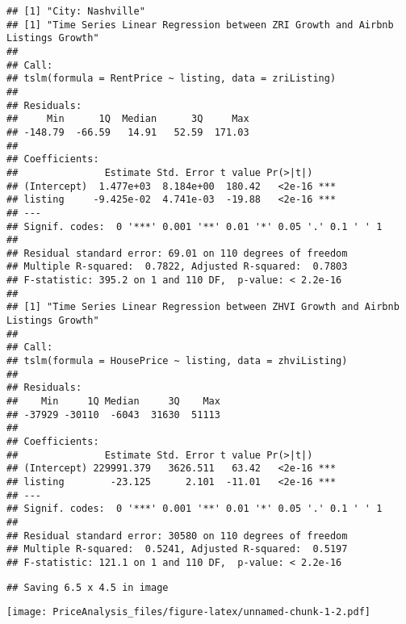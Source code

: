 \documentclass[
]{article}
\begin{document}
\begin{verbatim}
## [1] "City: Nashville"
## [1] "Time Series Linear Regression between ZRI Growth and Airbnb Listings Growth"
## 
## Call:
## tslm(formula = RentPrice ~ listing, data = zriListing)
## 
## Residuals:
##     Min      1Q  Median      3Q     Max 
## -148.79  -66.59   14.91   52.59  171.03 
## 
## Coefficients:
##               Estimate Std. Error t value Pr(>|t|)    
## (Intercept)  1.477e+03  8.184e+00  180.42   <2e-16 ***
## listing     -9.425e-02  4.741e-03  -19.88   <2e-16 ***
## ---
## Signif. codes:  0 '***' 0.001 '**' 0.01 '*' 0.05 '.' 0.1 ' ' 1
## 
## Residual standard error: 69.01 on 110 degrees of freedom
## Multiple R-squared:  0.7822, Adjusted R-squared:  0.7803 
## F-statistic: 395.2 on 1 and 110 DF,  p-value: < 2.2e-16
## 
## [1] "Time Series Linear Regression between ZHVI Growth and Airbnb Listings Growth"
## 
## Call:
## tslm(formula = HousePrice ~ listing, data = zhviListing)
## 
## Residuals:
##    Min     1Q Median     3Q    Max 
## -37929 -30110  -6043  31630  51113 
## 
## Coefficients:
##               Estimate Std. Error t value Pr(>|t|)    
## (Intercept) 229991.379   3626.511   63.42   <2e-16 ***
## listing        -23.125      2.101  -11.01   <2e-16 ***
## ---
## Signif. codes:  0 '***' 0.001 '**' 0.01 '*' 0.05 '.' 0.1 ' ' 1
## 
## Residual standard error: 30580 on 110 degrees of freedom
## Multiple R-squared:  0.5241, Adjusted R-squared:  0.5197 
## F-statistic: 121.1 on 1 and 110 DF,  p-value: < 2.2e-16
\end{verbatim}

\begin{verbatim}
## Saving 6.5 x 4.5 in image
\end{verbatim}

\texttt{[image: PriceAnalysis\_files/figure-latex/unnamed-chunk-1-2.pdf]}
\end{document}
